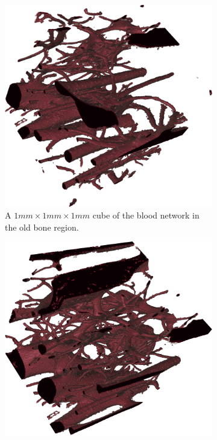 \begin{figure}
\begin{subfigure}[b]{\linewidth}
        \label{fig:blood-new-slice}
    \end{subfigure}
    \begin{subfigure}[b]{.48\linewidth}
    \centering
        \includegraphics[width=.9\linewidth,height=\linewidth]{generated/figure10_old_cube.png}
        \caption{A $1mm \times 1 mm \times 1 mm$ cube of the blood network in the old bone region.}
        \label{fig:blood-old-cube}
    \end{subfigure}
    \hfill
    \begin{subfigure}[b]{.48\linewidth}
    \centering
        \includegraphics[width=.9\linewidth,height=\linewidth]{generated/figure10_new_cube.png}

\end{subfigure}
\end{figure}
